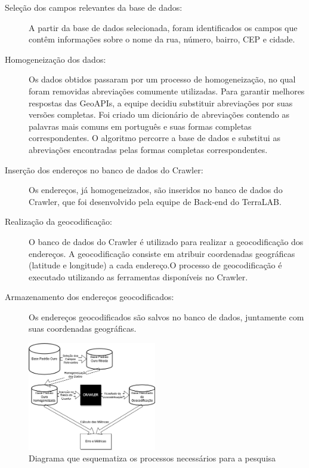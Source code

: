 \documentclass{article}
\begin{document}
\begin{description}
    \item [Seleção dos campos relevantes da base de dados:] A partir da base de dados selecionada, foram identificados os campos que contêm informações sobre o nome da rua, número, bairro, CEP e cidade.
    \item [Homogeneização dos dados:] Os dados obtidos passaram por um processo de homogeneização, no qual foram removidas abreviações comumente utilizadas. Para garantir melhores respostas das GeoAPIs, a equipe decidiu substituir abreviações por suas versões completas. Foi criado um dicionário de abreviações contendo as palavras mais comuns em português e suas formas completas correspondentes. O algoritmo percorre a base de dados e substitui as abreviações encontradas pelas formas completas correspondentes.
    \item [Inserção dos endereços no banco de dados do Crawler:] Os endereços, já homogeneizados, são inseridos no banco de dados do Crawler, que foi desenvolvido pela equipe de Back-end do TerraLAB.
    \item [Realização da geocodificação:] O banco de dados do Crawler é utilizado para realizar a geocodificação dos endereços. A geocodificação consiste em atribuir coordenadas geográficas (latitude e longitude) a cada endereço.O processo de geocodificação é executado utilizando as ferramentas disponíveis no Crawler.
    \item [Armazenamento dos endereços geocodificados:] 
    Os endereços geocodificados são salvos no banco de dados, juntamente com suas coordenadas geográficas.
\end{description}

\begin{figure}[ht]
    \centering
    \includegraphics[width=0.5\textwidth]{diagrama monografia.drawio.png}
    \caption{Diagrama que esquematiza os processos necessários para a pesquisa}
    \label{fig:diagramaGeo}
  \end{figure}
\end{document}
